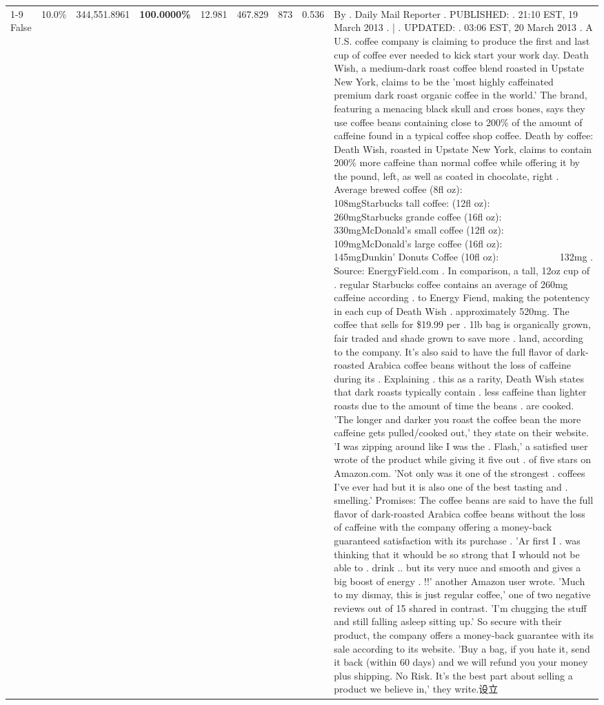 \begin{table}[H]
{\begin{tabular}{lllrlllll}
\cline{1-9}
False & 10.0\% & 344,551.8961 & \bfseries \color{red} 100.0000\% & 12.981 & 467.829 & 873 & 0.536 & By . Daily Mail Reporter . PUBLISHED: . 21:10 EST, 19 March 2013 . | . UPDATED: . 03:06 EST, 20 March 2013 . A U.S. coffee company is claiming to produce the first and last cup of coffee ever needed to kick start your work day. Death Wish, a medium-dark roast coffee blend roasted in Upstate New York, claims to be the 'most highly caffeinated premium dark roast organic coffee in the world.' The brand, featuring a menacing black skull and cross bones, says they use coffee beans containing close to 200\% of the amount of caffeine found in a typical coffee shop coffee. Death by coffee: Death Wish, roasted in Upstate New York, claims to contain 200\% more caffeine than normal coffee while offering it by the pound, left, as well as coated in chocolate, right . Average brewed coffee (8fl oz):              108mgStarbucks tall coffee: (12fl oz):                260mgStarbucks grande coffee (16fl oz):         330mgMcDonald's small coffee (12fl oz):           109mgMcDonald's large coffee (16fl oz):           145mgDunkin' Donuts Coffee (10fl oz):             132mg . Source: EnergyField.com . In comparison, a tall, 12oz cup of . regular Starbucks coffee contains an average of 260mg caffeine according . to Energy Fiend, making the potentency in each cup of Death Wish . approximately 520mg. The coffee that sells for \$19.99 per . 1lb bag is organically grown, fair traded and shade grown to save more . land, according to the company. It's also said to have the full flavor of dark-roasted Arabica coffee beans without the loss of caffeine during its . Explaining . this as a rarity, Death Wish states that dark roasts typically contain . less caffeine than lighter roasts due to the amount of time the beans . are cooked. 'The longer and darker you roast the coffee bean the more caffeine gets pulled/cooked out,' they state on their website. 'I was zipping around like I was the . Flash,' a satisfied user wrote of the product while giving it five out . of five stars on Amazon.com. 'Not only was it one of the strongest . coffees I've ever had but it is also one of the best tasting and . smelling.’ Promises: The coffee beans are said to have the full flavor of dark-roasted Arabica coffee beans without the loss of caffeine with the company offering a money-back guaranteed satisfaction with its purchase . 'Ar first I . was thinking that it whould be so strong that I whould not be able to . drink .. but its very nuce and smooth and gives a big boost of energy . !!' another Amazon user wrote. 'Much to my dismay, this is just regular coffee,' one of two negative reviews out of 15 shared in contrast. 'I'm chugging the stuff and still falling asleep sitting up.' So secure with their product, the company offers a money-back guarantee with its sale according to its website. 'Buy a bag, if you hate it, send it back (within 60 days) and we will refund you your money plus shipping. No Risk. It’s the best part about selling a product we believe in,' they write.设立 \\

\end{tabular}}
\end{table}
